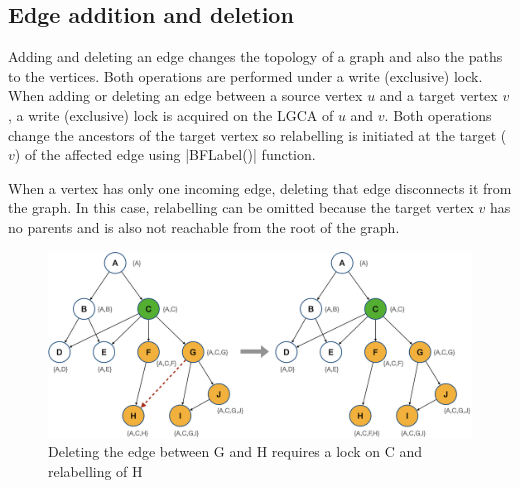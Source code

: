 \subsection{Edge addition and deletion}
Adding and deleting an edge changes the topology of a graph and also the paths to the vertices. 
Both operations are performed under a write (exclusive) lock. 
When adding or deleting an edge between a source vertex $u$ and a target vertex $v$, a write (exclusive) lock is acquired on the LGCA of $u$ and $v$. 
Both operations change the ancestors of the target vertex so relabelling is initiated at the target ($v$) of the affected edge using \inline|BFLabel()| function.

When a vertex has only one incoming edge, deleting that edge disconnects it from the graph. 
In this case, relabelling can be omitted because the target vertex $v$ has no parents and is also not reachable from the root of the graph. 

\begin{figure}[h]
	\centering
	\captionsetup{justification=centering}
	\includegraphics[width=\columnwidth]{figures/CALock_Delete_Edge.png}
	\caption{Deleting the edge between G and H requires a lock on C and relabelling of H}
	\label{calockedgeaddition}
\end{figure}



